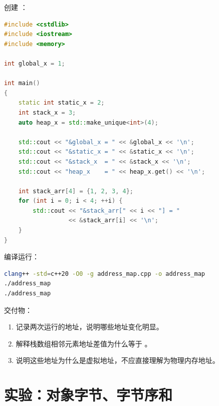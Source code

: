 \begin{labbox}
创建 ：

\begin{lstlisting}[language=C++]
#include <cstdlib>
#include <iostream>
#include <memory>

int global_x = 1;

int main()
{
    static int static_x = 2;
    int stack_x = 3;
    auto heap_x = std::make_unique<int>(4);

    std::cout << "&global_x = " << &global_x << '\n';
    std::cout << "&static_x = " << &static_x << '\n';
    std::cout << "&stack_x  = " << &stack_x << '\n';
    std::cout << "heap_x    = " << heap_x.get() << '\n';

    int stack_arr[4] = {1, 2, 3, 4};
    for (int i = 0; i < 4; ++i) {
        std::cout << "&stack_arr[" << i << "] = "
                  << &stack_arr[i] << '\n';
    }
}
\end{lstlisting}

编译运行：

\begin{lstlisting}[language=bash]
clang++ -std=c++20 -O0 -g address_map.cpp -o address_map
./address_map
./address_map
\end{lstlisting}

交付物：

\begin{enumerate}
  \item 记录两次运行的地址，说明哪些地址变化明显。
  \item 解释栈数组相邻元素地址差值为什么等于 。
  \item 说明这些地址为什么是虚拟地址，不应直接理解为物理内存地址。
\end{enumerate}
\end{labbox}

\section{实验：对象字节、字节序和 }

